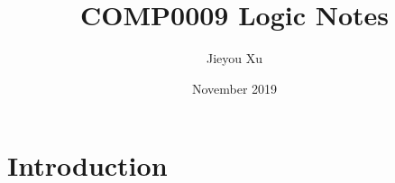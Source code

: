 \documentclass{report}
\title{COMP0009 Logic Notes}
\author{Jieyou Xu}
\date{November 2019}
\begin{document}
\maketitle

\section{Introduction}
\end{document}
